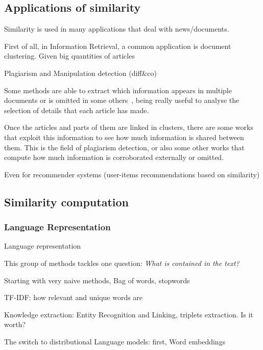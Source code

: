 \subsection{Applications of similarity}

Similarity is used in many applications that deal with news/documents.

First of all, in Information Retrieval, a common application is document clustering. Given big quantities of articles





Plagiarism and Manipulation detection (diff\&co)

Some methods are able to extract which information appears in multiple documents or is omitted in some others~\cite{bountouridis2018explaining}, being really useful to analyse the selection of details that each article has made.

Once the articles and parts of them are linked in clusters, there are some works that exploit this information to see how much information is shared between them. This is the field of plagiarism detection, or also some other works that compute how much information is corroborated externally or omitted.



Even for recommender systems (user-items recommendations based on similarity)

\subsection{Similarity computation}

\subsubsection{Language Representation}
Language representation

This group of methods tackles one question: \emph{What is contained in the text?}

Starting with very naive methods,
Bag of words, stopwords

TF-IDF: how relevant and unique words are\cite{jones1972statistical}

Knowledge extraction: Entity Recognition and Linking, triplets extraction. Is it worth?

The switch to distributional Language models:
first, Word embeddings

